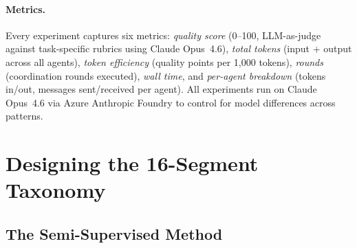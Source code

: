 \documentclass{article}
\begin{document}
\paragraph{Metrics.}
Every experiment captures six metrics: \emph{quality score} (0--100, LLM-as-judge
against task-specific rubrics using Claude Opus~4.6), \emph{total tokens} (input +
output across all agents), \emph{token efficiency} (quality points per 1,000 tokens),
\emph{rounds} (coordination rounds executed), \emph{wall time}, and \emph{per-agent
breakdown} (tokens in/out, messages sent/received per agent). All experiments run on
Claude Opus~4.6 via Azure Anthropic Foundry to control for model differences across
patterns.


\section{Designing the 16-Segment Taxonomy}
\label{sec:taxonomy}

\subsection{The Semi-Supervised Method}
\label{sec:meth-taxonomy}
\end{document}
